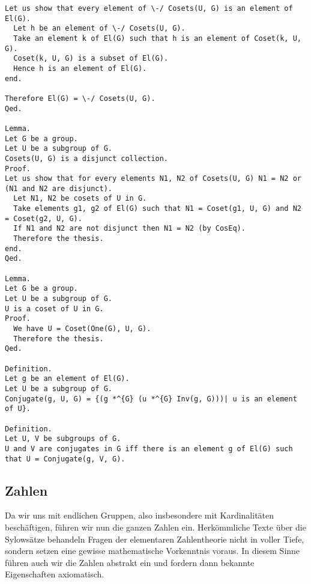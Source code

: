\documentclass[a4paper,12pt]{scrartcl}
\begin{document}
\begin{lstlisting}
Let us show that every element of \-/ Cosets(U, G) is an element of El(G).
  Let h be an element of \-/ Cosets(U, G).
  Take an element k of El(G) such that h is an element of Coset(k, U, G).
  Coset(k, U, G) is a subset of El(G).
  Hence h is an element of El(G).
end.

Therefore El(G) = \-/ Cosets(U, G).
Qed.

Lemma.
Let G be a group.
Let U be a subgroup of G.
Cosets(U, G) is a disjunct collection.
Proof.
Let us show that for every elements N1, N2 of Cosets(U, G) N1 = N2 or (N1 and N2 are disjunct).
  Let N1, N2 be cosets of U in G.
  Take elements g1, g2 of El(G) such that N1 = Coset(g1, U, G) and N2 = Coset(g2, U, G).
  If N1 and N2 are not disjunct then N1 = N2 (by CosEq).
  Therefore the thesis.
end.
Qed.

Lemma.
Let G be a group.
Let U be a subgroup of G.
U is a coset of U in G.
Proof.
  We have U = Coset(One(G), U, G).
  Therefore the thesis.
Qed.

Definition.
Let g be an element of El(G).
Let U be a subgroup of G.
Conjugate(g, U, G) = {(g *^{G} (u *^{G} Inv(g, G)))| u is an element of U}.

Definition.
Let U, V be subgroups of G.
U and V are conjugates in G iff there is an element g of El(G) such that U = Conjugate(g, V, G).

\end{lstlisting}

\subsection{Zahlen}

Da wir uns mit endlichen Gruppen, also insbesondere mit Kardinalitäten beschäftigen, führen wir nun die ganzen Zahlen ein. 
Herkömmliche Texte über die Sylowsätze \cite{bibtex.a} behandeln Fragen der elementaren Zahlentheorie nicht in voller Tiefe, sondern setzen eine gewisse mathematische Vorkenntnis voraus.
In diesem Sinne führen auch wir die Zahlen abstrakt ein und fordern dann bekannte Eigenschaften axiomatisch.
\end{document}
